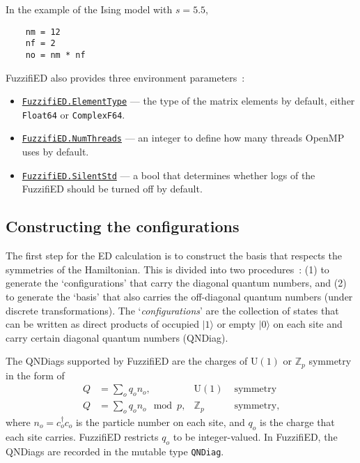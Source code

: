 \documentclass{timesjhep}
\begin{document}
In the example of the Ising model with $s=5.5$,
\begin{lstlisting}
    nm = 12
    nf = 2
    no = nm * nf
\end{lstlisting}

FuzzifiED also provides three environment parameters~:
\begin{itemize}
    \item \href{https://docs.fuzzified.world/core/\#FuzzifiED.ElementType}{\lstinline|FuzzifiED.ElementType|} --- the type of the matrix elements by default, either \lstinline|Float64| or \lstinline|ComplexF64|.
    \item \href{https://docs.fuzzified.world/core/\#FuzzifiED.NumThreads}{\lstinline|FuzzifiED.NumThreads|} --- an integer to define how many threads OpenMP uses by default.
    \item \href{https://docs.fuzzified.world/core/\#FuzzifiED.SilentStd}{\lstinline|FuzzifiED.SilentStd|} --- a bool that determines whether logs of the FuzzifiED should be turned off by default.
\end{itemize}

\subsection{Constructing the configurations}
\label{sec:ed_confs}

The first step for the ED calculation is to construct the basis that respects the symmetries of the Hamiltonian. This is divided into two procedures~: (1) to generate the `configurations' that carry the diagonal quantum numbers, and (2) to generate the `basis' that also carries the off-diagonal quantum numbers (under discrete transformations). The `\emph{configurations}' are the collection of states that can be written as direct products of occupied $|1\rangle$ or empty $|0\rangle$ on each site and carry certain diagonal quantum numbers (QNDiag).

The QNDiags supported by FuzzifiED are the charges of $\mathrm{U}(1)$ or $\mathbb{Z}_p$ symmetry in the form of
\begin{align}
    Q&=\sum_oq_on_o,&\mathrm{U}(1)&\textrm{ symmetry}\nonumber\\
    Q&=\sum_oq_on_o\mod p,&\mathbb{Z}_p&\textrm{ symmetry},
\end{align}
where $n_o=c^\dagger_oc_o$ is the particle number on each site, and $q_o$ is the charge that each site carries. FuzzifiED restricts $q_o$ to be integer-valued. In FuzzifiED, the QNDiags are recorded in the mutable type \lstinline|QNDiag|.
\end{document}
